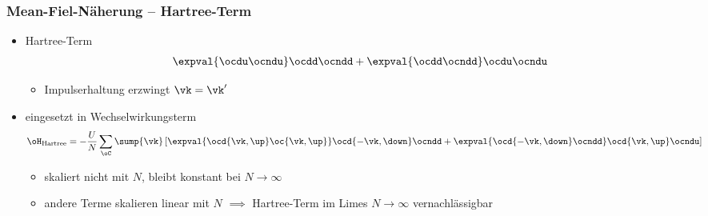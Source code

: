 \begin{frame}
    \frametitle{Mean-Fiel-Näherung -- Hartree-Term}
    \begin{itemize}
        \item Hartree-Term 
        \begin{align*}
            \expval{\ocdu \ocndu} \ocdd \ocndd + \expval{\ocdd \ocndd} \ocdu \ocndu
        \end{align*}
        \begin{itemize}
            \pause
            \item[$\rightarrow$] Impulserhaltung erzwingt $\vk = \vk'$ 
        \end{itemize}
        \pause
        \item eingesetzt in Wechselwirkungsterm 
        \begin{align*}
            \oH_\text{Hartree} &= -\frac{U}{N} \sum_\oC \sump{\vk} \left[\expval{\ocd{\vk, \up} \oc{\vk, \up}} \ocd{-\vk, \down} \ocndd + \expval{\ocd{-\vk, \down} \ocndd} \ocd{\vk, \up} \ocndu\right]
        \end{align*}
        \begin{itemize}
            \item[$\rightarrow$] skaliert nicht mit $N$, bleibt konstant bei $N \rightarrow \infty$
            \item[$\rightarrow$] andere Terme skalieren linear mit $N$ $\implies$ Hartree-Term im Limes $N \rightarrow \infty$ vernachlässigbar
        \end{itemize}
    \end{itemize}
\end{frame}


